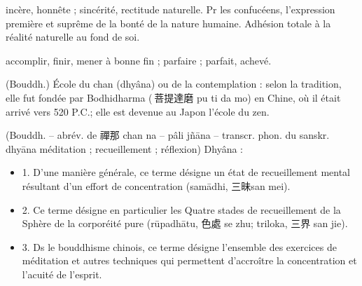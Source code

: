 \begin{Def}[cheng 誠]
    incère, honnête ; sincérité, rectitude naturelle. Pr les confucéens, l’expression première et suprême de la bonté de la nature humaine. Adhésion totale à la réalité naturelle au fond de soi. 
\end{Def}

\begin{Def}[cheng 成]
    accomplir, finir, mener à bonne fin ; parfaire ; parfait, achevé.
\end{Def}
\begin{Def}[chanzong 禪宗]
    (Bouddh.) École du chan (dhyâna) ou de la contemplation : selon la tradition, elle fut fondée par Bodhidharma ( 菩提達磨 pu ti da mo) en Chine, où il était arrivé vers 520 P.C.; elle est devenue au Japon l’école du zen.
\end{Def}
\begin{Def}[chan 禪]
    (Bouddh. – abrév. de 禪那 chan na – pâli jñāna – transcr. phon. du sanskr. dhyāna méditation ; recueillement ; réflexion) Dhyâna :	\begin{itemize}
        \item 1. D’une manière générale, ce terme désigne un état de recueillement mental résultant d’un effort de concentration (samādhi, 三昧san mei).  
        \item 2. Ce terme désigne en particulier les Quatre stades de recueillement de la Sphère de la corporéité pure (rūpadhātu, 色處 se zhu; triloka, 三界 san jie).  
        \item 3. Ds le bouddhisme chinois, ce terme désigne l’ensemble des exercices de méditation et autres techniques qui permettent d’accroître la concentration et l’acuité de l’esprit. 
    \end{itemize}
    
\end{Def}

